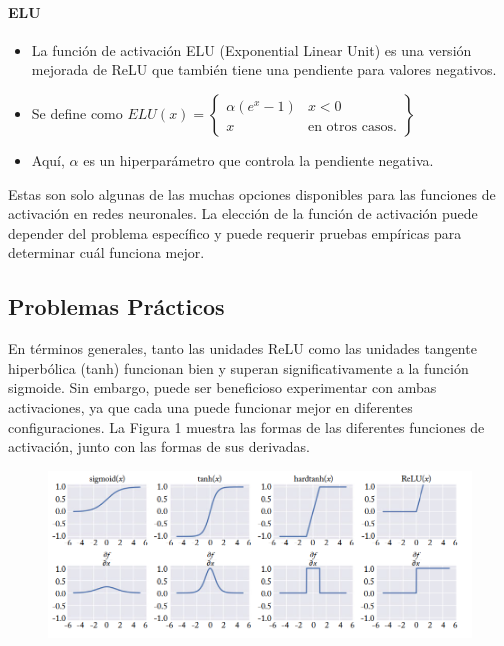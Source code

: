 \paragraph{ELU}
\begin{itemize}
\item La función de activación ELU (Exponential Linear Unit) \cite{clevert2015fast} es una versión mejorada de ReLU que también tiene una pendiente para valores negativos.
\item Se define como $ELU(x) = \left\{\begin{array}{lr}
        \alpha (e^x - 1) & x < 0\\
        x & \text{en otros casos.}
        \end{array} \right\}$
\item Aquí, $\alpha$ es un hiperparámetro que controla la pendiente negativa.
\end{itemize}


Estas son solo algunas de las muchas opciones disponibles para las funciones de activación en redes neuronales. La elección de la función de activación puede depender del problema específico y puede requerir pruebas empíricas para determinar cuál funciona mejor.



\subsection{Problemas Prácticos}
En términos generales, tanto las unidades ReLU como las unidades tangente hiperbólica (tanh) funcionan bien y superan significativamente a la función sigmoide. Sin embargo, puede ser beneficioso experimentar con ambas activaciones, ya que cada una puede funcionar mejor en diferentes configuraciones. La Figura 1 muestra las formas de las diferentes funciones de activación, junto con las formas de sus derivadas.

\begin{figure}[htb]
	\centering
	 \includegraphics[scale=0.35]{pics/activations.png}
\end{figure}

